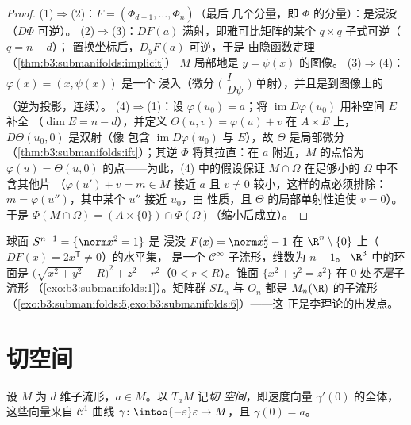 \begin{proof}
(1)$\Rightarrow$(2)：$F = (\Phi_{d+1}, \dots, \Phi_n)$（最后
几个分量，即 $\Phi$ 的分量）：是浸没（$D\Phi$ 可逆）。
(2)$\Rightarrow$(3)：$DF(a)$ 满射，即雅可比矩阵的某个 $q \times q$
子式可逆（$q = n - d$）；
置换坐标后，$D_yF(a)$ 可逆，于是
由隐函数定理（\cref{thm:b3:submanifolds:implicit}）
$M$ 局部地是 $y = \psi(x)$ 的图像。
(3)$\Rightarrow$(4)：$\varphi(x) = (x, \psi(x))$ 是一个
浸入（微分 $\bigl(\begin{smallmatrix}I\\
D\psi\end{smallmatrix}\bigr)$ 单射），并且是到图像上的
（逆为投影，连续）。
(4)$\Rightarrow$(1)：设 $\varphi(u_0) = a$；将
$\operatorname{im}D\varphi(u_0)$ 用补空间 $E$ 补全
（$\dim E = n - d$），并定义 $\Theta(u, v) = \varphi(u) + v$
在 $A\times E$ 上，$D\Theta(u_0, 0)$ 是双射（像
包含 $\operatorname{im}D\varphi(u_0)$ 与 $E$），故
$\Theta$ 是局部微分
（\cref{thm:b3:submanifolds:ift}）；其逆 $\Phi$
将其拉直：在 $a$ 附近，$M$ 的点恰为
$\varphi(u) = \Theta(u, 0)$ 的点——为此，(4) 中的假设保证
$M\cap\Omega$ 在足够小的 $\Omega$ 中不含其他片
（$\varphi(u') + v = m \in
M$ 接近 $a$ 且 $v \neq 0$ 较小，这样的点必须排除：
$m = \varphi(u'')$，其中某个 $u''$ 接近 $u_0$，由
性质，且 $\Theta$ 的局部单射性迫使
$v = 0$）。于是 $\Phi(M\cap\Omega) = (A\times\{0\})
\cap\Phi(\Omega)$（缩小后成立）。
\end{proof}

\begin{example}\label{ex:b3:submanifolds:examples}
球面 $S^{n-1} = \{\norm x^2 = 1\}$ 是
浸没 $F(x) = \norm x_2^2 - 1$ 在
$\R^n\setminus\{0\}$ 上（$DF(x) = 2x^{\mathsf T} \ne 0$）的水平集，
是一个 $\mathcal C^\infty$ 子流形，维数为 $n - 1$。
$\R^3$ 中的环面是 $\bigl(\sqrt{x^2 + y^2} -
R\bigr)^2 + z^2 - r^2$（$0 < r < R$）。锥面 $\{x^2 + y^2 =
z^2\}$ 在 $0$ 处\emph{不是}子流形
（\cref{exo:b3:submanifolds:1}）。矩阵群 $SL_n$ 与
$O_n$ 都是 $M_n(\R)$ 的子流形
（\cref{exo:b3:submanifolds:5,exo:b3:submanifolds:6}）——这
正是李理论的出发点。
\end{example}

\section{切空间}

\begin{definition}\label{def:b3:submanifolds:tangent}
设 $M$ 为 $d$ 维子流形，$a \in M$。以 $T_aM$ 记\emph{切
空间}，即速度向量
$\gamma'(0)$ 的全体，这些向量来自 $\mathcal C^1$ 曲线 $\gamma \colon
\intoo{-\varepsilon}\varepsilon \to M$，且 $\gamma(0) = a$。
\end{definition}

